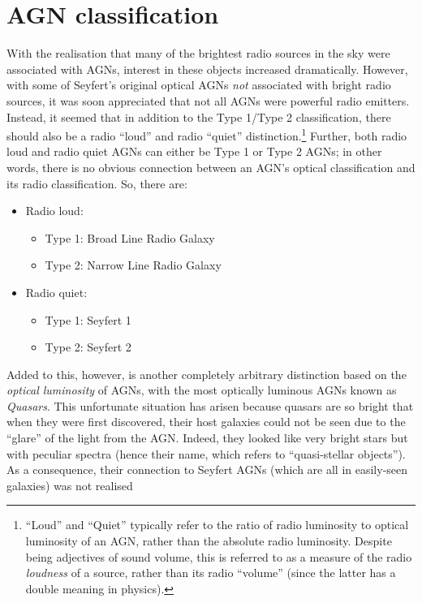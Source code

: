 \documentclass[11pt]{article}
\begin{document}
\section{AGN classification}
With the realisation that many of the brightest radio sources in the
sky were associated with AGNs, interest in these objects increased
dramatically. However, with some of Seyfert's original optical AGNs
{\it not} associated with bright radio sources, it was soon
appreciated that not all AGNs were powerful radio emitters. Instead,
it seemed that in addition to the Type 1/Type 2 classification, there
should also be a radio ``loud'' and radio ``quiet''
distinction.\footnote{``Loud'' and ``Quiet'' typically refer to the
  ratio of radio luminosity to optical luminosity of an AGN, rather
  than the absolute radio luminosity. Despite being adjectives of
  sound volume, this is referred to as a measure of the radio {\it
    loudness} of a source, rather than its radio ``volume'' (since the
  latter has a double meaning in physics).} Further, both radio loud
and radio quiet AGNs can either be Type 1 or Type 2 AGNs; in other
words, there is no obvious connection between an AGN's optical
classification and its radio classification. So, there
are:
\begin{itemize}
\item Radio loud:
  \begin{itemize}
    \item Type 1: Broad Line Radio Galaxy
    \item Type 2: Narrow Line Radio Galaxy
  \end{itemize}
\item Radio quiet:
  \begin{itemize}
    \item Type 1: Seyfert 1
    \item Type 2: Seyfert 2
  \end{itemize}
\end{itemize}
Added to this, however, is another completely arbitrary distinction
based on the {\it optical luminosity} of AGNs, with the most optically
luminous AGNs known as {\it Quasars}. This unfortunate situation has
arisen because quasars are so bright that when they were first
discovered, their host galaxies could not be seen due to the ``glare''
of the light from the AGN. Indeed, they looked like very bright stars
but with peculiar spectra (hence their name, which refers to
``quasi-stellar objects''). As a consequence, their connection to
Seyfert AGNs (which are all in easily-seen galaxies) was not realised
\end{document}
